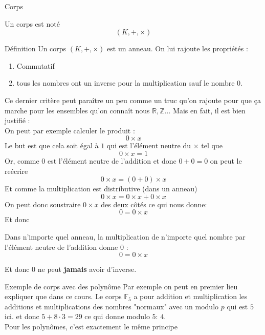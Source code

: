 \begin{parag}{Corps}
    \begin{definition}
        Un corps est noté
    \[(K, +, \times)\]
    \end{definition}
    \begin{subparag}{Définition}
        Un corps $(K, +, \times)$ est un anneau. On lui rajoute les propriétés :
        \begin{enumerate}
            \item Commutatif
            \item tous les nombres ont un inverse pour la multiplication sauf le nombre $0$.
        \end{enumerate}
        Ce dernier critère peut paraître un peu comme un truc qu'on rajoute pour que ça marche pour les ensembles qu'on connaît nous $\mathbb{R}, \mathbb{Z}...$ Mais en fait, il est bien justifié :
        \\
        On peut par exemple calculer le produit : 
        \[ 0 \times x\]
        Le but est que cela soit égal à $1$ qui est l'élément neutre du $\times$ tel  que
        \[0 \times x = 1\]
        Or, comme $0$ est l'élément neutre de l'addition et donc $0 + 0 = 0$ on peut le reécrire 
        \[0 \times x = (0 + 0) \times x\]
        Et comme la multiplication est distributive (dans un anneau)
        \[0 \times x = 0\times x + 0\times x\]
        On peut donc soustraire $0 \times x$ des deux côtés ce qui nous donne:
        \[0 = 0 \times x\]
        Et donc
        \begin{lemme}
            Dans n'importe quel anneau, la multiplication de n'importe quel nombre par l'élément neutre de l'addition donne $0$ : 
            \[0 = 0 \times x\]
            
        \end{lemme}
        Et donc $0$ ne peut \textbf{jamais} avoir d'inverse.

    \end{subparag}
\end{parag}
\begin{parag}{Exemple de corps avec des polynôme}
    Par exemple on peut en premier lieu expliquer que dans ce cours. Le corps $\mathbb{F}_5$ a pour addition et multiplication les additions et multiplications des nombres "normaux" avec un modulo $p$ qui est $5$ ici. et donc $5 + 8 \cdot 3= 29$ ce qui donne modulo $5$: $4$.
    \\
    Pour les polynômes, c'est exactement le même principe
\end{parag}


